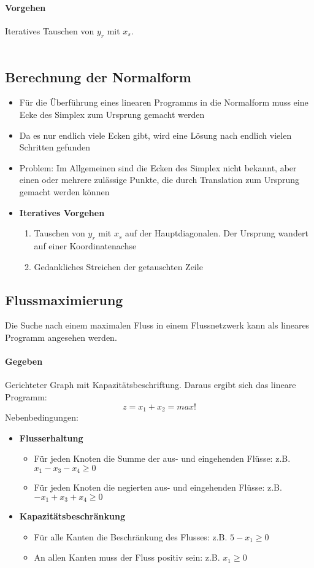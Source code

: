 \paragraph{Vorgehen} Iteratives Tauschen von \(y_r\) mit \(x_s\).
\text{}\\\\



\subsection{Berechnung der Normalform}
\begin{itemize}
	\item Für die Überführung eines linearen Programms in die Normalform muss eine Ecke des Simplex zum Ursprung gemacht werden
	\item Da es nur endlich viele Ecken gibt, wird eine Lösung nach endlich vielen Schritten gefunden
	\item Problem: Im Allgemeinen sind die Ecken des Simplex nicht bekannt, aber einen oder mehrere zulässige Punkte, die durch Translation zum Ursprung gemacht werden können
	\item \textbf{Iteratives Vorgehen}
	\begin{enumerate}
		\item Tauschen von \(y_r\) mit \(x_s\) auf der Hauptdiagonalen. Der Ursprung wandert auf einer Koordinatenachse
		\item Gedankliches Streichen der getauschten Zeile
	\end{enumerate}
\end{itemize}


\subsection{Flussmaximierung}
Die Suche nach einem maximalen Fluss in einem Flussnetzwerk kann als lineares Programm angesehen werden.

\paragraph{Gegeben} Gerichteter Graph mit Kapazitätsbeschriftung.
Daraus ergibt sich das lineare Programm:
\[z = x_1 + x_2 = max!\]
Nebenbedingungen:
\begin{itemize}
	\item \textbf{Flusserhaltung}
	\begin{itemize}
		\item Für jeden Knoten die Summe der aus- und eingehenden Flüsse: z.B. \(x_1-x_3-x_4 \geq 0\)
		\item Für jeden Knoten die negierten aus- und eingehenden Flüsse: z.B. \(-x_1+x_3+x_4 \geq 0\)
	\end{itemize}
	\item \textbf{Kapazitätsbeschränkung}
	\begin{itemize}
		\item Für alle Kanten die Beschränkung des Flusses: z.B. \(5-x_1 \geq 0\)
		\item An allen Kanten muss der Fluss positiv sein: z.B. \(x_1 \geq 0\)
	\end{itemize}
\end{itemize}


